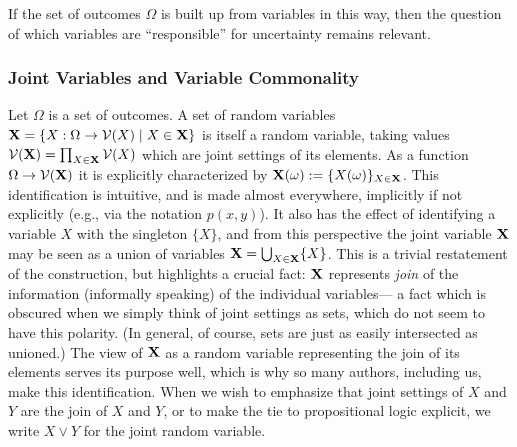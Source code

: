 \documentclass{article}
\begin{document}
    If the set of outcomes $\Omega$ is built up from variables in this way, then the question of which variables are ``responsible'' for uncertainty remains relevant.

    \subsubsection{Joint Variables and Variable Commonality }
    Let $\Omega$ is a set of outcomes. A set of random variables $\mathbf X = \{ X : \Omega \to \mathcal V(X)  \mid X \in \mathbf X \}$ is itself a random variable, taking values $\mathcal V(\mathbf X) = \prod_{X \in \mathbf X} \mathcal V(X) $ which are joint settings of its elements. As a function $\Omega \to \mathcal V(\mathbf X)$ it is explicitly characterized by $\mathbf X(\omega) := \{ X(\omega) \}_{X \in \mathbf X}$.
    This identification is intuitive, and is made almost everywhere, implicitly if not explicitly (e.g., via the notation $p(x,y)$). It also has the effect of identifying a variable $X$ with the singleton $\{X\}$, and from this perspective the joint variable $\mathbf X$ may be seen as a union of variables $\mathbf X = \bigcup_{X \in \mathbf X} \{ X \}$.
    This is a trivial restatement of the construction, but highlights a crucial fact: $\mathbf X$ represents \emph{join} of the information (informally speaking) of the individual variables--- a fact which is obscured when we simply think of joint settings as sets, which do not seem to have this polarity. (In general, of course, sets are just as easily intersected as unioned.) The view of $\mathbf X$ as a random variable representing the join of its elements serves its purpose well, which is why so many authors, including us, make this identification. When we wish to emphasize that joint settings of $X$ and $Y$ are the join of $X$ and $Y$, or to make the tie to propositional logic explicit, we write $X \lor Y$ for the joint random variable.
\end{document}
